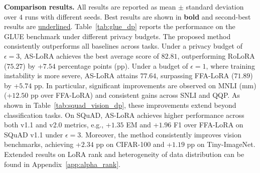 



\textbf{Comparison results.} All results are reported as mean $\pm$ standard deviation over $4$ runs with different seeds. Best results are shown in \textbf{bold} and second-best results are \underline{underlined}. Table~\ref{tab:glue_dp} reports the performance on the GLUE benchmark \cite{wang2018glue} under different privacy budgets. The proposed method consistently outperforms all baselines across tasks.
Under a privacy budget of $\epsilon = 3$, AS-LoRA achieves the best average score of $\mathbf{82.81}$, outperforming RoLoRA ($75.27$) by +$\mathbf{7.54}$ percentage points (pp). 
Under a budget of $\epsilon = 1$, where training instability is more severe, AS-LoRA attains $\mathbf{77.64}$, surpassing FFA-LoRA ($\mathbf{71.89}$) by +$\mathbf{5.74}$ pp. In particular, significant improvements are observed on MNLI (mm) (+$12.50$ pp over FFA-LoRA) and consistent gains across SNLI and QQP.
As shown in Table~\ref{tab:squad_vision_dp}, these improvements extend beyond classification tasks. On SQuAD, AS-LoRA achieves higher performance across both v1.1 and v2.0 metrics, e.g., +$1.35$ EM and +$1.96$ F1 over FFA-LoRA on SQuAD v1.1 under $\epsilon = 3$. Moreover, the method consistently improves vision benchmarks, achieving +$2.34$ pp on CIFAR-100 and +$1.19$ pp on Tiny-ImageNet. Extended results on LoRA rank and heterogeneity of data distribution can be found in Appendix~\ref{app:alpha_rank}.


